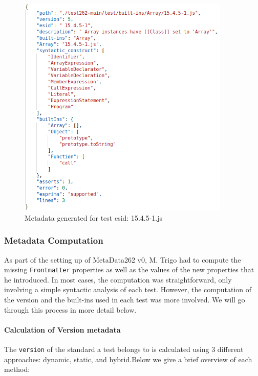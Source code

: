 \documentclass[runningheads]{llncs}
\begin{document}
\begin{figure}[ht]
    \centering
    \includegraphics[width=0.9\textwidth]{images/json_metadata.png}
    \caption{Metadata generated for test esid: 15.4.5-1.js}
    \label{fig:json_metadata}
\end{figure}



\subsubsection{Metadata Computation}

As part of the setting up of MetaData262 v0,  M. Trigo had to compute the missing \texttt{Frontmatter} properties as well as the values of the new properties that he introduced. In most cases, the computation was straightforward, only involving a simple syntactic analysis of each test. However, the computation of the version and the built-ins used in each test was more involved. We will go through this process in more detail below.

\paragraph{Calculation of Version metadata}
The \texttt{version} of the standard a test belongs to is calculated using 3 different approaches: dynamic, static, and hybrid.Below we give a brief overview of each method:
\end{document}

